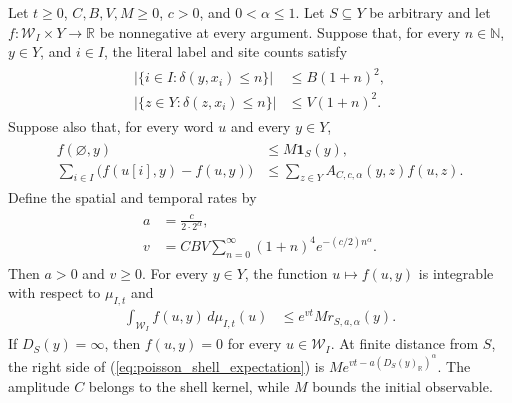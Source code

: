 \begin{theorem}
    \label{thm:poisson_word_shell_growth}
    \leanok
    Let $t\geq0$, $C,B,V,M\geq0$, $c>0$, and $0<\alpha\leq1$.
    Let $S\subseteq Y$ be arbitrary and let
    $f:\mathcal W_I\times Y\to\mathbb R$ be nonnegative at every
    argument.  Suppose that, for every $n\in\mathbb N$, $y\in Y$,
    and $i\in I$, the literal label and site counts satisfy
    \begin{align}
        \begin{aligned}
            \bigl|\{i\in I:\delta(y,x_i)\leq n\}\bigr|
             & \leq B(1+n)^2, \\
            \bigl|\{z\in Y:\delta(z,x_i)\leq n\}\bigr|
             & \leq V(1+n)^2.
        \end{aligned}
        \label{eq:poisson_shell_counts}
    \end{align}
    Suppose also that, for every word $u$ and every $y\in Y$,
    \begin{align}
        \begin{aligned}
            f(\varnothing,y) & \leq M\mathbf 1_S(y),                       \\
            \sum_{i\in I}\bigl(f(u[i],y)-f(u,y)\bigr)
                             & \leq\sum_{z\in Y}A_{C,c,\alpha}(y,z)f(u,z).
        \end{aligned}
        \label{eq:poisson_shell_increment}
    \end{align}
    Define the spatial and temporal rates by
    \begin{align}
        \begin{aligned}
            a & =\frac{c}{2\cdot2^\alpha},                        \\
            v & =CBV\sum_{n=0}^{\infty}(1+n)^4e^{-(c/2)n^\alpha}.
        \end{aligned}
        \label{eq:poisson_shell_rates}
    \end{align}
    Then $a>0$ and $v\geq0$.  For every $y\in Y$, the function
    $u\mapsto f(u,y)$ is integrable with respect to $\mu_{I,t}$ and
    \begin{align}
        \int_{\mathcal W_I}f(u,y)\,d\mu_{I,t}(u)
         & \leq e^{vt}M r_{S,a,\alpha}(y).
        \label{eq:poisson_shell_expectation}
    \end{align}
    If $D_S(y)=\infty$, then $f(u,y)=0$ for every $u\in\mathcal W_I$.
    At finite distance from $S$, the right side of
    (\ref{eq:poisson_shell_expectation}) is
    $M e^{vt-a(D_S(y)_{\mathbb R})^\alpha}$.
    The amplitude $C$ belongs to the shell kernel, while $M$ bounds
    the initial observable.
\end{theorem}
